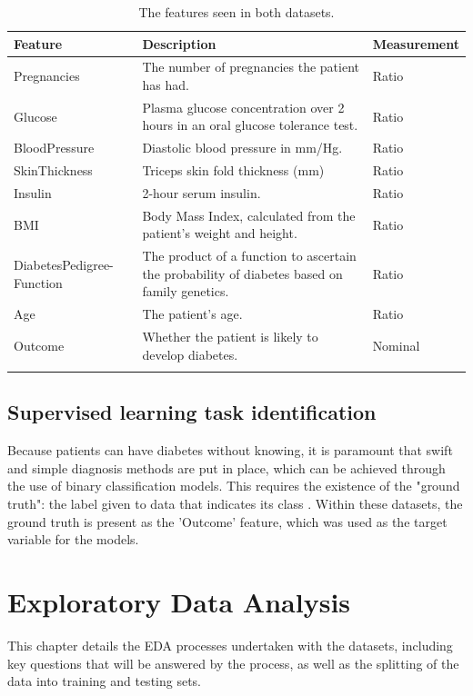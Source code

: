 \documentclass[12pt]{report}
\begin{document}
\begin{longtable}{ | p{} | p{} | p{} |}
    \hline
    \cellcolor{blue!25}Feature & \cellcolor{blue!25}Description & \cellcolor{blue!25}Measurement \\
    \hline
    Pregnancies & The number of pregnancies the patient has had. & Ratio\\
    \hline
    Glucose & Plasma glucose concentration over 2 hours in an oral glucose tolerance test. & Ratio \\
    \hline
    BloodPressure & Diastolic blood pressure in mm/Hg. & Ratio \\
    \hline
    SkinThickness & Triceps skin fold thickness (mm) & Ratio \\
    \hline
    Insulin & 2-hour serum insulin. & Ratio \\
    \hline
    BMI & Body Mass Index, calculated from the patient's weight and height. & Ratio \\
    \hline
    DiabetesPedigree-\newline Function & The product of a function to ascertain the probability of diabetes based on family genetics. \autocite{akmese_diagnosing_2022}
    & Ratio \\
    \hline
    Age & The patient's age. & Ratio\\
    \hline
    Outcome & Whether the patient is likely to develop diabetes. & Nominal\\
    \hline 
    \caption{The features seen in both datasets.}\label{tab:Features}
\end{longtable}

\pagebreak

\section{Supervised learning task identification}
Because patients can have diabetes without knowing,
it is paramount that swift and simple diagnosis methods are put in place, which can be achieved 
through the use of binary classification models. This requires the existence of the 
"ground truth": the label given to data that indicates its class \autocite{c3ai_what_nodate}. 
Within these datasets, the ground truth is present as the 'Outcome' feature, which was used 
as the target variable for the models.

\chapter{Exploratory Data Analysis}
This chapter details the EDA processes undertaken with the datasets, including 
key questions that will be answered by the process, as well as the splitting of the 
data into training and testing %
sets.
\end{document}
